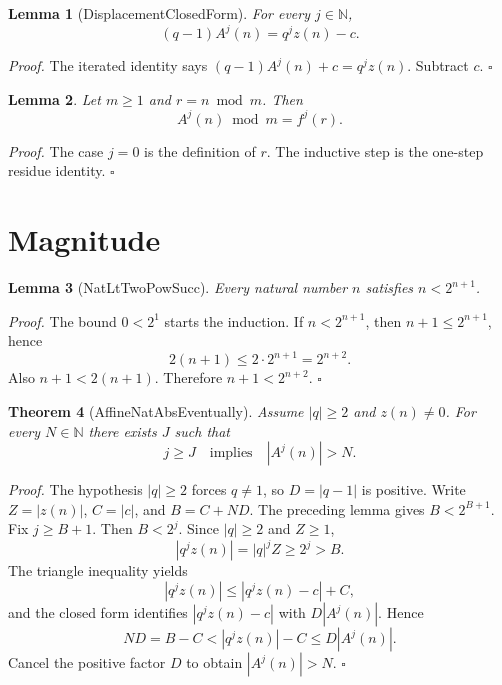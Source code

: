 \documentclass[11pt,letterpaper]{article}
\newcommand{\N}{\mathbb{N}}
\newtheorem{theorem}{Theorem}
\newtheorem{lemma}[theorem]{Lemma}
\newenvironment{proof}{\noindent\textit{Proof.}}{\hfill\(\square\)}
\begin{document}
\begin{lemma}[DisplacementClosedForm]
For every \(j\in\N\),
\[
  (q-1)A^{j}(n)=q^{j}z(n)-c.
\]
\end{lemma}

\begin{proof}
The iterated identity says \((q-1)A^{j}(n)+c=q^{j}z(n)\). Subtract \(c\).
\end{proof}

\begin{lemma}
Let \(m\ge 1\) and \(r=n\bmod m\). Then
\[
  A^{j}(n)\bmod m=f^{j}(r).
\]
\end{lemma}

\begin{proof}
The case \(j=0\) is the definition of \(r\). The inductive step is the one-step residue identity.
\end{proof}

\section{Magnitude}

\begin{lemma}[NatLtTwoPowSucc]
Every natural number \(n\) satisfies \(n<2^{n+1}\).
\end{lemma}

\begin{proof}
The bound \(0<2^{1}\) starts the induction. If \(n<2^{n+1}\), then \(n+1\le 2^{n+1}\), hence
\[
  2(n+1)\le 2\cdot 2^{n+1}=2^{n+2}.
\]
Also \(n+1<2(n+1)\). Therefore \(n+1<2^{n+2}\).
\end{proof}

\begin{theorem}[AffineNatAbsEventually]
Assume \(|q|\ge 2\) and \(z(n)\ne 0\). For every \(N\in\N\) there exists \(J\) such that
\[
  j\ge J\quad\text{implies}\quad |A^{j}(n)|>N.
\]
\end{theorem}

\begin{proof}
The hypothesis \(|q|\ge 2\) forces \(q\ne 1\), so \(D=|q-1|\) is positive. Write \(Z=|z(n)|\), \(C=|c|\), and \(B=C+ND\). The preceding lemma gives \(B<2^{B+1}\). Fix \(j\ge B+1\). Then \(B<2^{j}\). Since \(|q|\ge 2\) and \(Z\ge 1\),
\[
  |q^{j}z(n)|=|q|^{j}Z\ge 2^{j}>B.
\]
The triangle inequality yields
\[
  |q^{j}z(n)|\le |q^{j}z(n)-c|+C,
\]
and the closed form identifies \(|q^{j}z(n)-c|\) with \(D|A^{j}(n)|\). Hence
\[
  ND=B-C<|q^{j}z(n)|-C\le D|A^{j}(n)|.
\]
Cancel the positive factor \(D\) to obtain \(|A^{j}(n)|>N\).
\end{proof}
\end{document}

